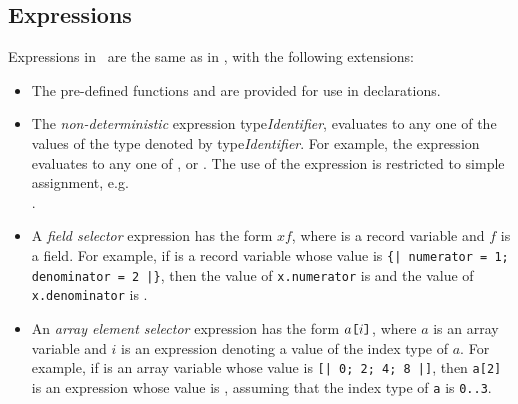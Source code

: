 \subsection{Expressions}
Expressions in \sdml\ are the same as in \candle, with the following 
extensions:
\begin{itemize}
\item The pre-defined functions  and  are provided
  for use in  declarations.
\item The \emph{non-deterministic} expression  type\emph{Identifier},
  evaluates to any one of the values of the type
  denoted by type\emph{Identifier}. For example, the expression 
   evaluates to any one of ,  or 
  . The use of the  expression is restricted to simple 
  assignment, e.g. \\  \trm{:=} .   
\item A \emph{field selector} expression has the form $x$$f$, where
   is a record variable and $f$ is a field.
  For example, if  is a record variable whose value is
  \verb'{| numerator = 1; denominator = 2 |}', then
  the value of \verb'x.numerator' is  and the value of
  \verb'x.denominator' is .  
\item An \emph{array element selector} expression has the form
  $a\mbox{\tt [}i\mbox{\tt ]}$, where $a$ is an array variable and $i$ is an
  expression denoting a value of the index type of $a$. For
  example, if  is an array variable whose value is
  \verb'[| 0; 2; 4; 8 |]', then \verb'a[2]' is an expression whose value is 
  , assuming that the index type of \verb'a' is \verb'0..3'.
\end{itemize}

